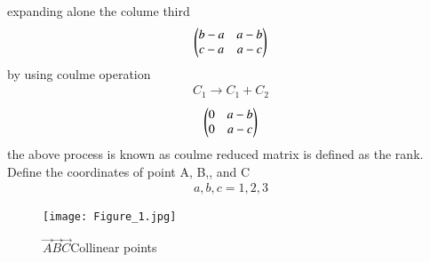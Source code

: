 \documentclass[journal]{IEEEtran}
\begin{document}
                expanding alone the colume third\\
    \begin{align}
                   \begin{pmatrix}
                           b-a & a-b\\
                           c-a & a-c\end{pmatrix}
    \end{align}
                  by using coulme operation
    \begin{align}
                C_{1}\rightarrow{C_{1}+C_{2}}
    \end{align}
    \begin{align}
                    \begin{pmatrix}
                           0 & a-b\\
                           0 & a-c\end{pmatrix}
    \end{align}
               the above process is known as coulme reduced matrix is defined as the rank.\\
               Define the coordinates of point A, B,, and C
    \begin{align}
             a,b,c = 1,2,3
    \end{align}

     \begin{figure}[h!]
	   \centering
	  \texttt{[image: Figure\_1.jpg]}
	\caption{ $\vec{A}\vec{B}\vec{C}$Collinear points}


	  \label{stemplot}
    \end{figure}
              
    
                  
 
\end{document}
